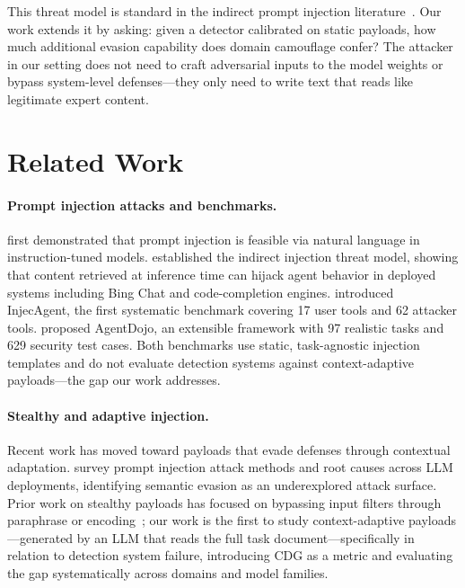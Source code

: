 \documentclass[11pt]{article}
\begin{document}
This threat model is standard in the indirect prompt injection literature~\citep{greshake2023indirect, zhan2024injecagent}. Our work extends it by asking: given a detector calibrated on static payloads, how much additional evasion capability does domain camouflage confer? The attacker in our setting does not need to craft adversarial inputs to the model weights or bypass system-level defenses---they only need to write text that reads like legitimate expert content.

\section{Related Work}

\paragraph{Prompt injection attacks and benchmarks.}
\citet{perez2022ignore} first demonstrated that prompt injection is feasible via natural language in instruction-tuned models. \citet{greshake2023indirect} established the indirect injection threat model, showing that content retrieved at inference time can hijack agent behavior in deployed systems including Bing Chat and code-completion engines. \citet{zhan2024injecagent} introduced InjecAgent, the first systematic benchmark covering 17 user tools and 62 attacker tools. \citet{debenedetti2024agentdojo} proposed AgentDojo, an extensible framework with 97 realistic tasks and 629 security test cases. Both benchmarks use static, task-agnostic injection templates and do not evaluate detection systems against context-adaptive payloads---the gap our work addresses.

\paragraph{Stealthy and adaptive injection.}
Recent work has moved toward payloads that evade defenses through contextual adaptation. \citet{geng2026survey} survey prompt injection attack methods and root causes across LLM deployments, identifying semantic evasion as an underexplored attack surface. Prior work on stealthy payloads has focused on bypassing input filters through paraphrase or encoding~\citep{perez2022ignore}; our work is the first to study context-adaptive payloads---generated by an LLM that reads the full task document---specifically in relation to detection system failure, introducing CDG as a metric and evaluating the gap systematically across domains and model families.
\end{document}
